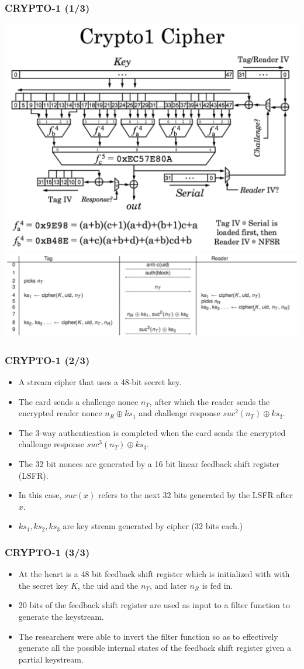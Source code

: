 \documentclass[12pt]{beamer}
\begin{document}
\begin{frame}
\frametitle{CRYPTO-1 (1/3)}
\begin{center}
  \includegraphics[width=0.5\linewidth]{crypto-1}
  \includegraphics[width=0.7\linewidth]{card-comm}
\end{center}
\end{frame}

\begin{frame}
\frametitle{CRYPTO-1 (2/3)}
\begin{itemize}
	\item A stream cipher that uses a 48-bit secret key.
	\item The card sends a challenge nonce $n_T$, after which the reader sends the encrypted reader nonce $n_R\oplus ks_1$ and challenge response $suc^2(n_T)\oplus ks_2$.
	\item The 3-way authentication is completed when the card sends the encrypted challenge response $suc^3(n_T)\oplus ks_3$.
	\item The 32 bit nonces are generated by a 16 bit linear feedback shift register (LSFR).
	\item In this case, $suc(x)$ refers to the next 32 bits generated by the LSFR after $x$.
	\item $ks_1, ks_2, ks_3$ are key stream generated by cipher (32 bits each.)
\end{itemize}
\end{frame}

\begin{frame}
\frametitle{CRYPTO-1 (3/3)}
\begin{itemize}
	\item At the heart is a 48 bit feedback shift register which is initialized with with the secret key $K$, the uid and the $n_T$, and later $n_R$ is fed in.
	\item 20 bits of the feedback shift register are used as input to a filter function to generate the keystream.
	\item The researchers were able to invert the filter function so as to effectively generate all the possible internal states of the feedback shift register given a partial keystream.
\end{itemize}
\end{frame}
\end{document}
